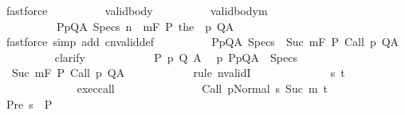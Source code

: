 \begin{isabellebody}
\ fastforce\isanewline
\ \ \ \ \ \ \ \ \isamarkupfalse%
\ valid{\isacharunderscore}body\isanewline
\ \ \ \ \ \ \ \ \isamarkupfalse%
\ valid{\isacharunderscore}body{\isacharunderscore}m{\isacharcolon}\ \isanewline
\ \ \ \ \ \ \ \ \ \ {\isachardoublequoteopen}{\isasymforall}{\isacharparenleft}P{\isacharcomma}p{\isacharcomma}Q{\isacharcomma}A{\isacharparenright}\ {\isasymin}Specs{\isachardot}\ {\isasymforall}n{\isachardot}\ {\isasymGamma}\ {\isasymTurnstile}m{\isacharcolon}\isactrlbsub {\isacharslash}F\isactrlesub \ P\ {\isacharparenleft}the\ {\isacharparenleft}{\isasymGamma}\ p{\isacharparenright}{\isacharparenright}\ Q{\isacharcomma}A{\isachardoublequoteclose}\isanewline
\ \ \ \ \ \ \ \ \ \ \isamarkupfalse%
\ {\isacharparenleft}fastforce\ simp\ add{\isacharcolon}\ cnvalid{\isacharunderscore}def{\isacharparenright}\isanewline
\ \ \ \ \ \ \ \ \isamarkupfalse%
\ {\isachardoublequoteopen}{\isasymforall}{\isacharparenleft}P{\isacharcomma}p{\isacharcomma}Q{\isacharcomma}A{\isacharparenright}\ {\isasymin}Specs{\isachardot}\ {\isasymGamma}\ {\isasymTurnstile}Suc\ m{\isacharcolon}\isactrlbsub {\isacharslash}F\isactrlesub \ P\ {\isacharparenleft}Call\ p{\isacharparenright}\ Q{\isacharcomma}A{\isachardoublequoteclose}\isanewline
\ \ \ \ \ \ \ \ \isamarkupfalse%
\ {\isacharparenleft}clarify{\isacharparenright}\isanewline
\ \ \ \ \ \ \ \ \ \ \isamarkupfalse%
\ P\ p\ Q\ A\ \isamarkupfalse%
\ p{\isacharcolon}\ {\isachardoublequoteopen}{\isacharparenleft}P{\isacharcomma}p{\isacharcomma}Q{\isacharcomma}A{\isacharparenright}\ {\isasymin}\ Specs{\isachardoublequoteclose}\isanewline
\ \ \ \ \ \ \ \ \ \ \isamarkupfalse%
\ {\isachardoublequoteopen}{\isasymGamma}\ {\isasymTurnstile}Suc\ m{\isacharcolon}\isactrlbsub {\isacharslash}F\isactrlesub \ P\ {\isacharparenleft}Call\ p{\isacharparenright}\ Q{\isacharcomma}A{\isachardoublequoteclose}\isanewline
\ \ \ \ \ \ \ \ \ \ \isamarkupfalse%
\ {\isacharparenleft}rule\ nvalidI{\isacharparenright}\isanewline
\ \ \ \ \ \ \ \ \ \ \ \ \isamarkupfalse%
\ s\ t\isanewline
\ \ \ \ \ \ \ \ \ \ \ \ \isamarkupfalse%
\ exec{\isacharunderscore}call{\isacharcolon}\ \isanewline
\ \ \ \ \ \ \ \ \ \ \ \ \ \ {\isachardoublequoteopen}{\isasymGamma}{\isasymturnstile}{\isasymlangle}Call\ p{\isacharcomma}Normal\ s{\isasymrangle}\ {\isacharequal}Suc\ m{\isasymRightarrow}\ t{\isachardoublequoteclose}\isanewline
\ \ \ \ \ \ \ \ \ \ \ \ \isamarkupfalse%
\ Pre{\isacharcolon}\ {\isachardoublequoteopen}s\ {\isasymin}\ P{\isachardoublequoteclose}\isanewline

\end{isabellebody}
